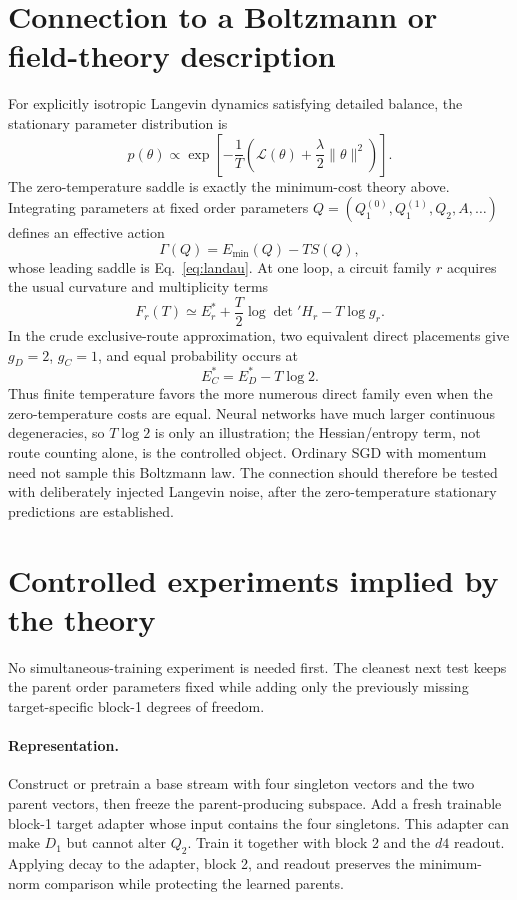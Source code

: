 \documentclass[11pt]{article}
\begin{document}
\section{Connection to a Boltzmann or field-theory description}

For explicitly isotropic Langevin dynamics satisfying detailed balance, the stationary
parameter distribution is
\begin{equation}
p(\theta)\propto
\exp\left[-\frac{1}{T}\left(
\mathcal L(\theta)+\frac\lambda2\|\theta\|^2\right)\right].
\end{equation}
The zero-temperature saddle is exactly the minimum-cost theory above.  Integrating parameters
at fixed order parameters \(Q=(Q_1^{(0)},Q_1^{(1)},Q_2,A,\ldots)\) defines an effective action
\begin{equation}
\Gamma(Q)=E_{\min}(Q)-T S(Q),
\end{equation}
whose leading saddle is Eq.~\eqref{eq:landau}.  At one loop, a circuit family \(r\) acquires
the usual curvature and multiplicity terms
\begin{equation}
F_r(T)\simeq E_r^*+\frac{T}{2}\log\det{}'H_r-T\log g_r.
\label{eq:one-loop}
\end{equation}
In the crude exclusive-route approximation, two equivalent direct placements give
\(g_D=2\), \(g_C=1\), and equal probability occurs at
\begin{equation}
E_C^*=E_D^*-T\log2.
\label{eq:entropy-shift}
\end{equation}
Thus finite temperature favors the more numerous direct family even when the zero-temperature
costs are equal.  Neural networks have much larger continuous degeneracies, so \(T\log2\) is
only an illustration; the Hessian/entropy term, not route counting alone, is the controlled
object.  Ordinary SGD with momentum need not sample this Boltzmann law.  The connection should
therefore be tested with deliberately injected Langevin noise, after the zero-temperature
stationary predictions are established.

\section{Controlled experiments implied by the theory}

No simultaneous-training experiment is needed first.  The cleanest next test keeps the parent
order parameters fixed while adding only the previously missing target-specific block-1
degrees of freedom.

\paragraph{Representation.}
Construct or pretrain a base stream with four singleton vectors and the two parent vectors,
then freeze the parent-producing subspace.  Add a fresh trainable block-1 target adapter whose
input contains the four singletons.  This adapter can make \(D_1\) but cannot alter \(Q_2\).
Train it together with block 2 and the \(d4\) readout.  Applying decay to the adapter, block 2,
and readout preserves the minimum-norm comparison while protecting the learned parents.
\end{document}
